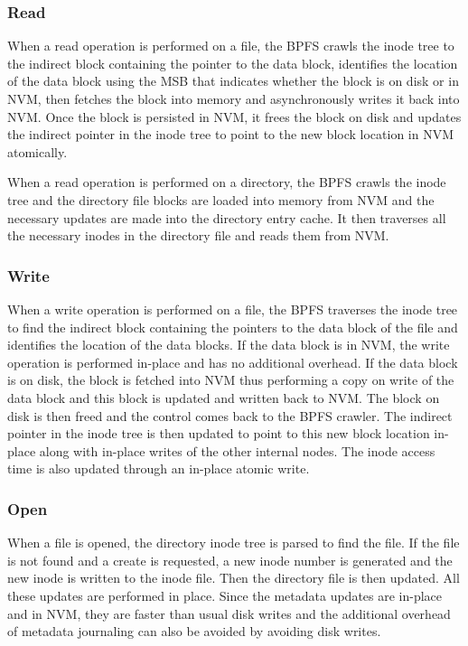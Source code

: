 \subsubsection{Read}
When a read operation is performed on a file, the BPFS crawls the inode tree to the indirect block containing the pointer to the data block, identifies the location of the data block using the MSB that indicates whether the block is on disk or in NVM, then fetches the block into memory and asynchronously writes it back into NVM. Once the block is persisted in NVM, it frees the block on disk and updates the indirect pointer in the inode tree to point to the new block location in NVM atomically.

When a read operation is performed on a directory, the BPFS crawls the inode tree and the directory file blocks are loaded into memory from NVM and the necessary updates are made into the directory entry cache. It then traverses all the necessary inodes in the directory file and reads them from NVM.

\subsubsection{Write}
When a write operation is performed on a file, the BPFS traverses the inode tree to find the indirect block containing the pointers to the data block of the file and identifies the location of the data blocks. If the data block is in NVM, the write operation is performed in-place and has no additional overhead. If the data block is on disk, the block is fetched into NVM thus performing a copy on write of the data block and this block is updated and written back to NVM. The block on disk is then freed and the control comes back to the BPFS crawler. The indirect pointer in the inode tree is then updated to point to this new block location in-place along with in-place writes of the other internal nodes. The inode access time is also updated through an in-place atomic write.

\subsubsection{Open}
When a file is opened, the directory inode tree is parsed to find the file. If the file is not found and a create is requested, a new inode number is generated and the new inode is written to the inode file. Then the directory file is then updated. All these updates are performed in place. Since the metadata updates are in-place and in NVM, they are faster than usual disk writes and the additional overhead of metadata journaling can also be avoided by avoiding disk writes.
